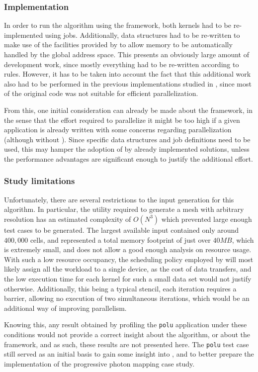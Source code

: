 \documentclass[main.tex]{subfiles}
\begin{document}
\subsubsection{Implementation}

In order to run the algorithm using the framework, both kernels had to be re-implemented using \gama jobs. Additionally, data structures had to be re-written to make use of the facilities provided by \gama to allow memory to be automatically handled by the global address space.
This presents an obviously large amount of development work, since mostly everything had to be re-written according to \gama rules. However, it has to be taken into account the fact that this additional work also had to be performed in the previous implementations studied in \cite{naps2012}, since most of the original code was not suitable for efficient parallelization.

From this, one initial consideration can already be made about the framework, in the sense that the effort required to parallelize it might be too high if a given application is already written with some concerns regarding parallelization (although without \gama). Since specific data structures and job definitions need to be used, this may hamper the adoption of \gama by already implemented solutions, unless the performance advantages are significant enough to justify the additional effort.


\subsubsection{Study limitations}

Unfortunately, there are several restrictions to the input generation for this algorithm. In particular, the utility required to generate a mesh with arbitrary resolution has an estimated complexity of $O(N^3)$ which prevented large enough test cases to be generated. The largest available input contained only around $400,000$ cells, and represented a total memory footprint of just over $40MB$, which is extremely small, and does not allow a good enough analysis on resource usage. With such a low resource occupancy, the scheduling policy employed by \gama will most likely assign all the workload to a single device, as the cost of data transfers, and the low execution time for each kernel for such a small data set would not justify otherwise. Additionally, this being a typical stencil, each iteration requires a barrier, allowing no execution of two simultaneous iterations, which would be an additional way of improving parallelism.

Knowing this, any result obtained by profiling the \texttt{polu} application under these conditions would not provide a correct insight about the algorithm, or about the framework, and as such, these results are not presented here.
The \texttt{polu} test case still served as an initial basis to gain some insight into \gama, and to better prepare the implementation of the progressive photon mapping case study.
\end{document}
